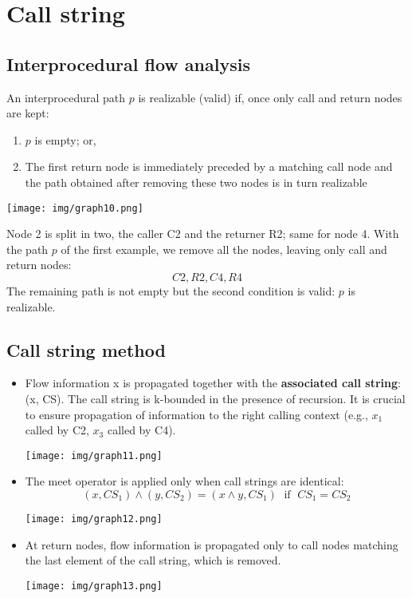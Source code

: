 \documentclass[a4paper, 10pt, titlepage]{article}
\begin{document}
\newpage
\section{Call string}
\subsection{Interprocedural flow analysis}
An interprocedural path $p$ is realizable (valid) if, once only call and return nodes are kept:
\begin{enumerate}
\item $p$ is empty; or,
\item The first return node is immediately preceded by a matching call node and the path obtained after removing these two nodes is in turn realizable
\end{enumerate}
\begin{center}
\texttt{[image: img/graph10.png]}
\end{center}
Node 2 is split in two, the caller C2 and the returner R2; same for node 4. With the path $p$ of the first example, we remove all the nodes, leaving only call and return nodes:
$$C2, R2, C4, R4$$
The remaining path is not empty but the second condition is valid: $p$ is realizable.

\subsection{Call string method}
\begin{itemize}
\item Flow information x is propagated together with the \textbf{associated call string}: (x, CS). The call string is k-bounded in the presence of recursion. It is crucial to ensure propagation of information to the right calling context (e.g., $x_1$ called by C2, $x_3$ called by C4). 
\begin{center}
\texttt{[image: img/graph11.png]}
\end{center}
\item The meet operator is applied only when call strings are identical:
$$(x, CS_1) \wedge (y, CS_2) = (x \wedge y, CS_1) \;\text{ if }\; CS_1 = CS_2$$
\begin{center}
\texttt{[image: img/graph12.png]}
\end{center}
\item At return nodes, flow information is propagated only to call nodes matching the last element of the call string, which is removed.
\begin{center}
\texttt{[image: img/graph13.png]}
\end{center}
\end{itemize}
\end{document}
